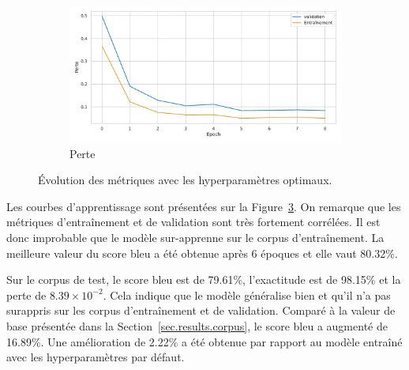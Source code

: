 \begin{figure}[!hbt]
\begin{subfigure}{.5\textwidth}
\begin{center}
        \end{center}
        \label{fig.results.tuned.training.bleu}
    \end{subfigure}
    \begin{subfigure}{.5\textwidth}
        \begin{center}
            \includegraphics[width=\textwidth]{assets/python/tuned-loss.pdf}
        \end{center}
        \caption{Perte}
        \label{fig.results.tuned.training.loss}
    \end{subfigure}
    \caption{Évolution des métriques avec les hyperparamètres optimaux.}
    \label{fig.results.tuned.training}
\end{figure}

Les courbes d'apprentissage sont présentées sur la Figure~\ref{fig.results.tuned.training}.
On remarque que les métriques d'entraînement et de validation sont très fortement corrélées.
Il est donc improbable que le modèle sur-apprenne sur le corpus d'entraînement.
La meilleure valeur du score \gls{bleu} a été obtenue après 6 époques et elle vaut 80.32\%.

Sur le corpus de test, le score \gls{bleu} est de 79.61\%, 
l'exactitude est de 98.15\% et la perte de \(8.39\times 10^{-2}\).
Cela indique que le modèle généralise bien et qu'il n'a pas surappris sur les corpus d'entraînement et de validation.
Comparé à la valeur de base présentée dans la Section~\ref{sec.results.corpus},
le score \gls{bleu} a augmenté de 16.89\%.
Une amélioration de 2.22\% a été obtenue par rapport au modèle entraîné avec les hyperparamètres par défaut.

